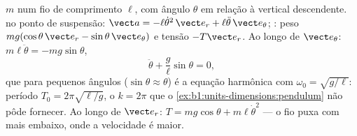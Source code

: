 \begin{example}\label{ex:b1:newton-dynamics:pendulum}
 $m$ num fio de comprimento $\ell$, com ângulo $\theta$ em relação à vertical
descendente.  no ponto de suspensão: $\vect a =
-\ell\dot\theta^2\,\vect e_r + \ell\ddot\theta\,\vect e_\theta$; :
peso $mg(\cos\theta\,\vect e_r - \sin\theta\,\vect e_\theta)$ e
tensão $-T\vect e_r$. Ao longo de $\vect e_\theta$: $m\ell\ddot\theta =
-mg\sin\theta$,
\[
\ddot\theta + \frac{g}{\ell}\sin\theta = 0 ,
\]
que para pequenos ângulos ($\sin\theta \approx \theta$) é a equação
harmônica com $\omega_0 = \sqrt{g/\ell}$: período $T_0 = 2\pi\sqrt{\ell/g}$,
o $k = 2\pi$ que o \cref{ex:b1:units-dimensions:pendulum} não pôde
fornecer. Ao longo de $\vect e_r$: $T = mg\cos\theta + m\ell\dot\theta^2$ --- o
fio puxa com mais  embaixo, onde a velocidade é maior.
\end{example}

